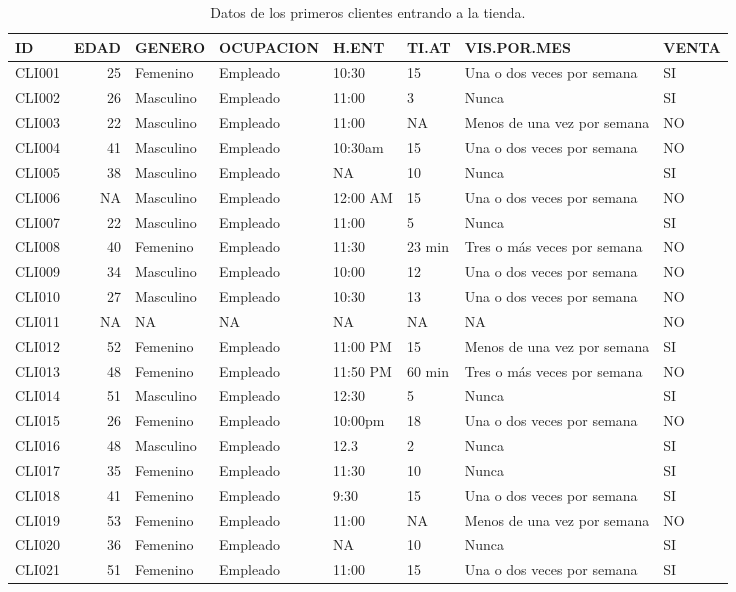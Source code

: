 \documentclass[]{book}
\begin{document}
\begin{table}

\caption{\label{tab:datos-crudos}Datos de los primeros clientes entrando a la tienda.}
\centering
\begin{tabular}[t]{lrllllll}
\toprule
ID & EDAD & GENERO & OCUPACION & H.ENT & TI.AT & VIS.POR.MES & VENTA\\
\midrule
CLI001 & 25 & Femenino & Empleado & 10:30 & 15 & Una o dos veces por semana & SI\\
CLI002 & 26 & Masculino & Empleado & 11:00 & 3 & Nunca & SI\\
CLI003 & 22 & Masculino & Empleado & 11:00 & NA & Menos de una vez por semana & NO\\
CLI004 & 41 & Masculino & Empleado & 10:30am & 15 & Una o dos veces por semana & NO\\
CLI005 & 38 & Masculino & Empleado & NA & 10 & Nunca & SI\\
\addlinespace
CLI006 & NA & Masculino & Empleado & 12:00 AM & 15 & Una o dos veces por semana & NO\\
CLI007 & 22 & Masculino & Empleado & 11:00 & 5 & Nunca & SI\\
CLI008 & 40 & Femenino & Empleado & 11:30 & 23 min & Tres o más veces por semana & NO\\
CLI009 & 34 & Masculino & Empleado & 10:00 & 12 & Una o dos veces por semana & NO\\
CLI010 & 27 & Masculino & Empleado & 10:30 & 13 & Una o dos veces por semana & NO\\
\addlinespace
CLI011 & NA & NA & NA & NA & NA & NA & NO\\
CLI012 & 52 & Femenino & Empleado & 11:00 PM & 15 & Menos de una vez por semana & SI\\
CLI013 & 48 & Femenino & Empleado & 11:50 PM & 60 min & Tres o más veces por semana & NO\\
CLI014 & 51 & Masculino & Empleado & 12:30 & 5 & Nunca & SI\\
CLI015 & 26 & Femenino & Empleado & 10:00pm & 18 & Una o dos veces por semana & NO\\
\addlinespace
CLI016 & 48 & Masculino & Empleado & 12.3 & 2 & Nunca & SI\\
CLI017 & 35 & Femenino & Empleado & 11:30 & 10 & Nunca & SI\\
CLI018 & 41 & Femenino & Empleado & 9:30 & 15 & Una o dos veces por semana & SI\\
CLI019 & 53 & Femenino & Empleado & 11:00 & NA & Menos de una vez por semana & NO\\
CLI020 & 36 & Femenino & Empleado & NA & 10 & Nunca & SI\\
CLI021 & 51 & Femenino & Empleado & 11:00 & 15 & Una o dos veces por semana & SI\\
\bottomrule
\end{tabular}
\end{table}
\end{document}
